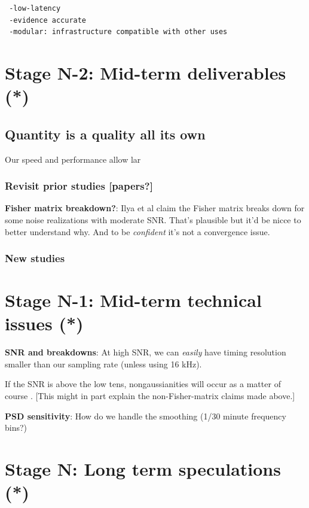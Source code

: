 \documentclass[twocolumn,prd,nofootinbib]{revtex4}
\begin{document}
\begin{widetext}
\begin{verbatim}
 -low-latency
 -evidence accurate
 -modular: infrastructure compatible with other uses
\end{verbatim}



\section{Stage N-2: Mid-term deliverables  (*)}
\subsection{Quantity is a quality all its own}
Our speed and performance allow lar

\subsubsection{Revisit prior studies [papers?]}

\noindent \textbf{Fisher matrix breakdown?}: Ilya et al claim the Fisher matrix breaks down for some noise realizations
with moderate SNR.  That's plausible but it'd be nicce to better understand why.  And to be \emph{confident} it's not a
convergence issue.

\subsubsection{New studies}



\section{Stage N-1: Mid-term technical issues (*)}

\noindent \textbf{SNR and breakdowns}: At high SNR, we can \emph{easily} have timing resolution smaller than our
sampling rate (unless using 16 kHz). 

If the SNR is above the low tens, nongaussianities will occur as a matter of course .  [This might in part explain the
  non-Fisher-matrix claims made above.]

\noindent \textbf{PSD sensitivity}: How do we handle the smoothing (1/30 minute  frequency bins?)



\section{Stage N: Long term speculations (*)}



\end{widetext}
\end{document}
